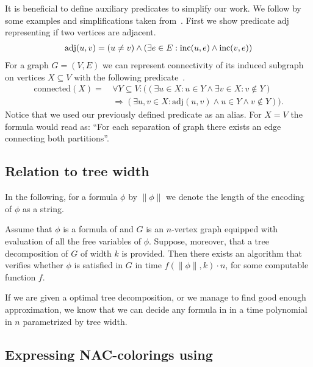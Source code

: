 It is beneficial to define auxiliary predicates to simplify our work.
We follow by some examples and simplifications taken from~\cite{book_parametrized_algorithms}.
First we show predicate \( \text{adj} \) representing if two vertices are adjacent.
%
\begin{align*}
	\text{adj}(u, v) = (u \ne v) \land (\exists e \in E : \text{inc} (u, e) \land \text{inc} (v, e))
\end{align*}
%
For a graph \( G = (V, E) \) we can represent connectivity of its induced subgraph
on vertices \( X \subseteq V \) with the following predicate~\cite{book_parametrized_algorithms}.
%
\begin{align*}
	\text{connected}(X) = \, &
	\forall Y \subseteq V : \Big(
	(
	\exists u \in X : u \in Y \land
	\exists v \in X : v \not\in Y
	)
	\\ &
	\Rightarrow
	(
	\exists u, v \in X : \text{adj}(u, v) \land u \in Y \land v \not\in Y
	)\Big).
\end{align*}
%
Notice that we used our previously defined predicate as an alias.
For \( X = V \) the formula would read as:
``For each separation of graph there exists an edge connecting both partitions''.

\subsection{Relation to tree width}

In the following, for a formula \( \phi \) by \( \|\phi\| \)
we denote the length of the encoding of \( \phi \) as a string.
%
\begin{theorem}%
	\label{theorem:courcelles_theorem}%
	Assume that \( \phi \) is a formula of \MSO{} and
	\( G \) is an \( n \)-vertex graph equipped
	with evaluation of all the free variables of \( \phi \).
	Suppose, moreover, that a tree decomposition of \( G \) of width \( k \) is provided.
	Then there exists an algorithm that verifies whether \( \phi \)
	is satisfied in \( G \) in time \( f (\|\phi\|, k) \cdot n \),
	for some computable function \( f \).
\end{theorem}
%
If we are given a optimal tree decomposition, or we manage to find good enough
approximation, we know that we can decide any formula in \MSO{} in a time
polynomial in \( n \) parametrized by tree width.

\subsection{Expressing NAC-colorings using \MSO{}}

